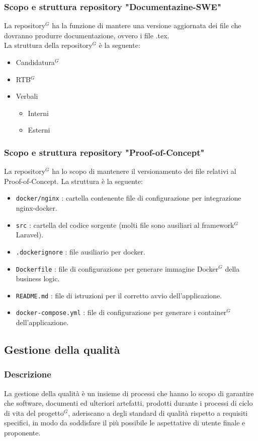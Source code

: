 \documentclass[a4paper,10pt]{article}
\begin{document}
\subsubsection{Scopo e struttura repository "Documentazine-SWE"}
La repository$^G$ ha la funzione di mantere una versione aggiornata dei file che dovranno produrre documentazione, ovvero i file .tex.\\
La struttura della repository$^G$ è la seguente:
\begin{itemize}
  \item Candidatura$^G$
  \item RTB$^G$
  \item Verbali 
  \begin{itemize}
    \item Interni
    \item Esterni
  \end{itemize}
\end{itemize}
\subsubsection{Scopo e struttura repository "Proof-of-Concept"}
La repository$^G$ ha lo scopo di mantenere il versionamento dei file relativi al Proof-of-Concept.
La struttura è la seguente:
\begin{itemize}
  \item \texttt{docker/nginx} : cartella contenente file di configurazione per integrazione nginx-docker.
  \item \texttt{src} : cartella del codice sorgente (molti file sono ausiliari al framework$^G$ Laravel).
  \item \texttt{.dockerignore} : file ausiliario per docker.
  \item \texttt{Dockerfile} : file di configurazione per generare immagine Docker$^G$ della business logic.
  \item \texttt{README.md} : file di istruzioni per il corretto avvio dell'applicazione.
  \item \texttt{docker-compose.yml} : file di configurazione per generare i container$^G$ dell'applicazione.
\end{itemize}

\subsection{Gestione della qualità}
\subsubsection{Descrizione}
La gestione della qualità è un insieme di processi che hanno lo scopo di garantire che software, documenti ed ulteriori artefatti, prodotti durante
i processi di ciclo di vita del progetto$^G$, aderiscano a degli standard di qualità rispetto a requisiti specifici, in modo da soddisfare il più possibile 
le aspettative di utente finale e proponente.
\end{document}
